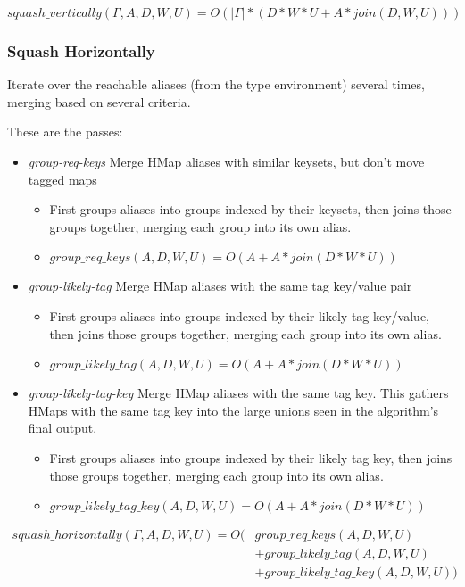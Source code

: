 \[
squash\_vertically(\Gamma, A, D, W, U) = O(|\Gamma| * (D*W*U + A*join(D, W, U)))
\]

\subsubsection{Squash Horizontally}
\label{squash-horizontally}

Iterate over the reachable aliases (from the type environment)
several times, merging based on several criteria.

These are the passes:

\begin{itemize}
	\item \emph{group-req-keys} Merge HMap aliases with similar keysets, but
		don't move tagged maps
		\begin{itemize}
			\item First groups aliases into groups indexed by their keysets, then
					joins those groups together, merging each group into its own alias.
			\item $group\_req\_keys(A,D,W,U) = O(A + A*join(D*W*U))$
		\end{itemize}
	\item \emph{group-likely-tag} Merge HMap aliases with the same tag key/value pair
		\begin{itemize}
			\item First groups aliases into groups indexed by their likely tag key/value, then
					joins those groups together, merging each group into its own alias.
			\item $group\_likely\_tag(A,D,W,U) = O(A + A*join(D*W*U))$
		\end{itemize}
	\item \emph{group-likely-tag-key} Merge HMap aliases with the same tag key.
			  This gathers HMaps with the same tag key into the large unions seen in the algorithm's
				final output.
		\begin{itemize}
			\item First groups aliases into groups indexed by their likely tag key, then
					joins those groups together, merging each group into its own alias.
			\item $group\_likely\_tag\_key(A,D,W,U) = O(A + A*join(D*W*U))$
		\end{itemize}
\end{itemize}

\begin{align*}
squash\_horizontally(\Gamma, A, D, W, U) = O(&group\_req\_keys(A,D,W,U)\\
								  													 &+ group\_likely\_tag(A,D,W,U) \\
								  												   &+ group\_likely\_tag\_key(A,D,W,U))
\end{align*}

